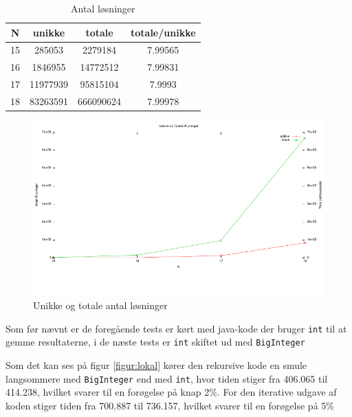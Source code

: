 \begin{table}
	\begin{center}
		\begin{tabular}{|c|c|c|c|}
			\hline N & unikke & totale & totale/unikke \\
			\hline 15 & 285053 & 2279184 & 7.99565 \\
			\hline 16 & 1846955 & 14772512 & 7.99831 \\
			\hline 17 & 11977939 & 95815104  & 7.9993 \\
			\hline 18 & 83263591 & 666090624 & 7.99978 \\
			\hline
		\end{tabular}
		\caption{Antal løsninger}
		\label{tabel:unikkevstotale}
	\end{center}
\end{table}

\begin{figure}[h]
\begin{center}
\includegraphics{../benchmarks/unikkevstotale.pdf}
\caption{Unikke og totale antal løsninger} 
\label{figur:unikkevstotale}
\end{center}
\end{figure}

Som før nævnt er de foregående tests er kørt med java-kode der bruger \texttt{int} til at gemme resultaterne,
i de næste tests er \texttt{int} skiftet ud med \texttt{BigInteger} 

Som det kan ses på figur \ref{figur:lokal} kører den rekursive kode en smule
langsommere med \texttt{BigInteger} end med \texttt{int}, hvor tiden stiger fra
406.065 til 414.238, hvilket svarer til en forøgelse
på knap 2\%. For den iterative udgave af koden stiger tiden fra 700.887 til
736.157, hvilket svarer til en forøgelse på 5\% 

